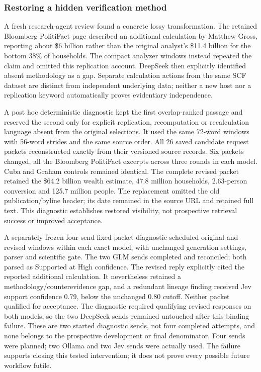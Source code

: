 \documentclass[conference]{IEEEtran}
\newcommand{\pct}{\%}
\begin{document}
\subsubsection{Restoring a hidden verification method}
A fresh research-agent review found a concrete lossy transformation. The retained Bloomberg PolitiFact page described an additional calculation by Matthew Gross, reporting about \$6 billion rather than the original analyst's \$11.4 billion for the bottom 38\pct{} of households. The compact analyzer windows instead repeated the claim and omitted this replication account. DeepSeek then explicitly identified absent methodology as a gap. Separate calculation actions from the same SCF dataset are distinct from independent underlying data; neither a new host nor a replication keyword automatically proves evidentiary independence.

A post hoc deterministic diagnostic kept the first overlap-ranked passage and reserved the second only for explicit replication, recomputation or recalculation language absent from the original selections. It used the same 72-word windows with 56-word strides and the same source order. All 26 saved candidate request packets reconstructed exactly from their versioned source records. Six packets changed, all the Bloomberg PolitiFact excerpts across three rounds in each model. Cuba and Graham controls remained identical. The complete revised packet retained the \$64.2 billion wealth estimate, 47.8 million households, 2.63-person conversion and 125.7 million people. The replacement omitted the old publication/byline header; its date remained in the source URL and retained full text. This diagnostic establishes restored visibility, not prospective retrieval success or improved acceptance.

A separately frozen four-send fixed-packet diagnostic scheduled original and revised windows within each exact model, with unchanged generation settings, parser and scientific gate. The two GLM sends completed and reconciled; both parsed as Supported at High confidence. The revised reply explicitly cited the reported additional calculation. It nevertheless retained a methodology/counterevidence gap, and a redundant lineage finding received Jev support confidence 0.79, below the unchanged 0.80 cutoff. Neither packet qualified for acceptance. The diagnostic required qualifying revised responses on both models, so the two DeepSeek sends remained untouched after this binding failure. These are two started diagnostic sends, not four completed attempts, and none belongs to the prospective development or final denominator. Four sends were planned; two Ollama and two Jev sends were actually used. The failure supports closing this tested intervention; it does not prove every possible future workflow futile.
\end{document}
